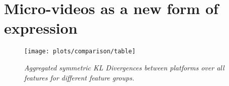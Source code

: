 \section{Micro-videos as a new form of expression}







\label{sec:new-vine-old-bottle}

\vspace{-2mm}
\begin{figure}[!htb]
\centering
\texttt{[image: plots/comparison/table]}
\caption{\textsl{ Aggregated symmetric KL Divergences between platforms over all features for different feature groups.}}
	\label{fig:comparisontable}
	\vspace{-2mm}

\end{figure}


